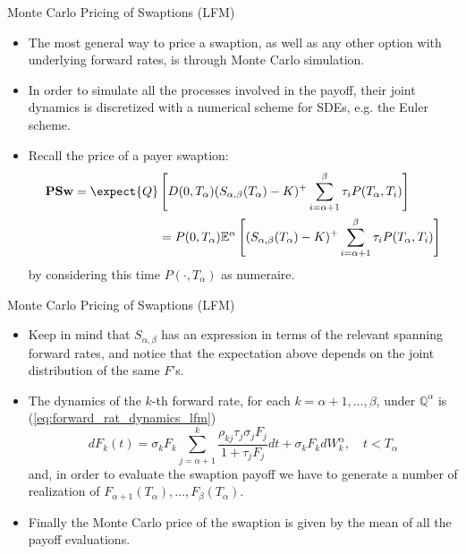 \documentclass{beamer}
\begin{document}
\begin{frame}{Monte Carlo Pricing of Swaptions (LFM)}
  \begin{itemize}
  \item<1-> The most general way to price a swaption, as well as any other option with underlying forward rates, is through Monte Carlo simulation. 
  \item<2-> In order to simulate all the processes involved in the payoff, their joint dynamics is discretized with a numerical scheme for SDEs, e.g. the Euler scheme.
  \item<3-> Recall the price of a payer swaption:
    \begin{equation*}
      \begin{aligned}
        \textbf{PSw} = \expect{Q}&\left[D(0, T_\alpha) (S_{\alpha,\beta}(T_\alpha) - K)^+ \sum_{i=\alpha+1}^\beta \tau_i P(T_\alpha, T_i)\right] \\
        &= P(0, T_\alpha)\mathbb{E}^\alpha\left[(S_{\alpha, \beta}(T_\alpha) - K)^+ \sum^\beta_{i=\alpha+1} \tau_i P(T_\alpha, T_i)\right]
      \end{aligned}
    \end{equation*}
    by considering this time $P(\cdot, T_\alpha)$ as numeraire.
  \end{itemize}
\end{frame}

\begin{frame}{Monte Carlo Pricing of Swaptions (LFM)}
  \begin{itemize}
  \item<1-> Keep in mind that $S_{\alpha,\beta}$ has an expression in terms of the relevant spanning forward rates, and notice that the expectation above depends on the joint distribution of the same $F$’s.
  \item<2-> The dynamics of the $k$-th forward rate, for each $k = \alpha + 1,\ldots, \beta$, under $\mathbb{Q}^\alpha$ is (\cref{eq:forward_rat_dynamics_lfm})
\begin{equation}
  dF_k(t) = \sigma_kF_k\sum_{j=\alpha+1}^k\frac{\rho_{kj}\tau_j\sigma_jF_j}{1+\tau_jF_j}dt+\sigma_kF_k dW^\alpha_k, \quad t<T_\alpha
  \label{eq:dynamics_4.1}
\end{equation}
and, in order to evaluate the swaption payoff we have to generate a number of realization of $F_{\alpha+1}(T_\alpha),\ldots, F_\beta(T_\alpha)$. 
\item<3-> Finally the Monte Carlo price of the swaption is given by the mean of all the payoff evaluations.
  \end{itemize}
\end{frame}
\end{document}

